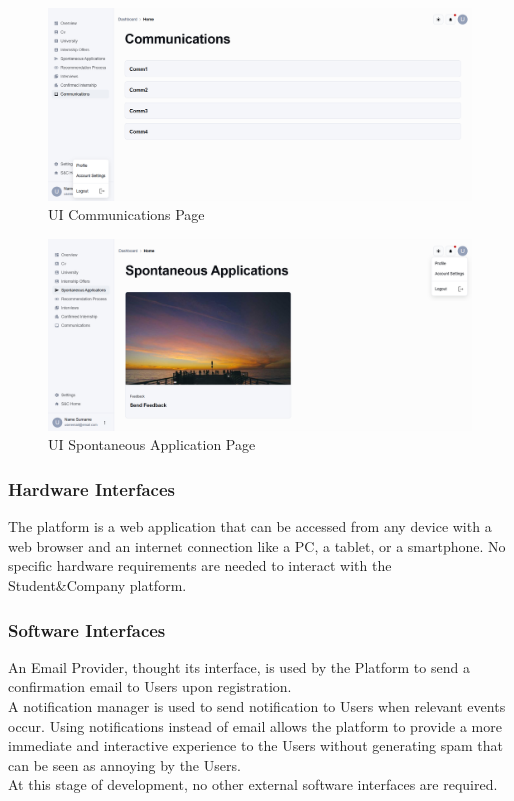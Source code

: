 \begin{figure}[H]
    \centering
    \includegraphics[width=\textwidth]{Latex/Images/Communication.png}
    \caption{UI Communications Page}
    \label{fig:comunicationspage}
\end{figure}
\begin{figure}[H]
    \centering
    \includegraphics[width=\textwidth]{Latex/Images/SpontaneousApplication.png}
    \caption{UI Spontaneous Application Page}
    \label{fig:applicationspage}
\end{figure}

\subsubsection{Hardware Interfaces}
The platform is a web application that can be accessed from any device with a web browser and an internet connection like a PC, a tablet, or a smartphone. No specific hardware requirements are needed to interact with the Student\&Company platform.
\subsubsection{Software Interfaces}
An Email Provider, thought its interface, is used by the Platform to send a confirmation email to Users upon registration. \\
A notification manager is used to send notification to Users when relevant events occur. Using notifications instead of email allows the platform to provide a more immediate and interactive experience to the Users without generating spam that can be seen as annoying by the Users.\\
At this stage of development, no other external software interfaces are required.
